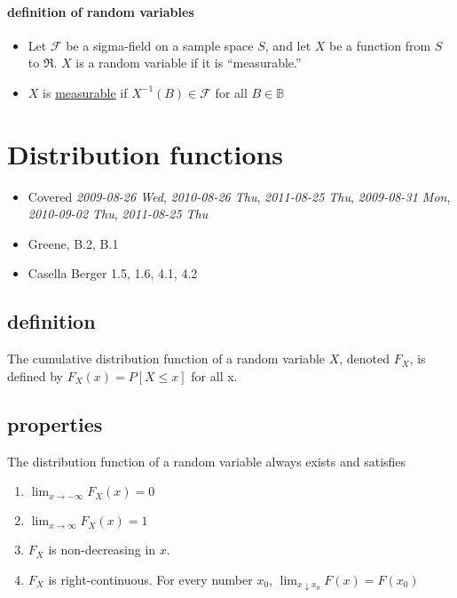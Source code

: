 \paragraph{definition of random variables}
\label{sec-1-3-1}

\begin{itemize}
\item Let $\mathcal{F}$ be a sigma-field on a sample space $S$, and
        let $X$ be a function from $S$ to $\Re$.  $X$ is a random
        variable if it is ``measurable.''
\item $X$ is \underline{measurable} if $X^{-1}(B) \in \mathcal{F}$ for all $B
        \in \mathbb{B}$
\end{itemize}
\section{Distribution functions}
\label{sec-2}

\begin{itemize}
\item Covered \textit{2009-08-26 Wed}, \textit{2010-08-26 Thu}, \textit{2011-08-25 Thu},
      \textit{2009-08-31 Mon}, \textit{2010-09-02 Thu}, \textit{2011-08-25 Thu}
\item Greene, B.2, B.1
\item Casella Berger 1.5, 1.6, 4.1, 4.2
\end{itemize}
\subsection{definition}
\label{sec-2-1}

     The cumulative distribution function of a random variable $X$,
     denoted $F_X$, is defined by $F_X(x) = P[X \leq x]$ for all x.
\subsection{properties}
\label{sec-2-2}

     The distribution function of a random variable always exists and
     satisfies
\begin{enumerate}
\item $\lim_{x \to -\infty} F_X(x) = 0$
\item $\lim_{x \to \infty} F_X(x) = 1$
\item $F_X$ is non-decreasing in $x$.
\item $F_X$ is right-continuous.  For every number $x_0$, $\lim_{x
        \downarrow x_0} F(x) = F(x_0)$
\end{enumerate}
